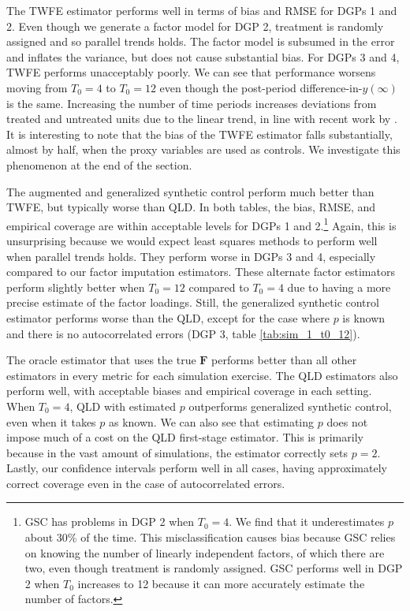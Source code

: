 \documentclass[12pt]{article}
\begin{document}
The TWFE estimator performs well in terms of bias and RMSE for DGPs 1 and 2. 
Even though we generate a factor model for DGP 2, treatment is randomly assigned and so parallel trends holds. 
The factor model is subsumed in the error and inflates the variance, but does not cause substantial bias. 
For DGPs 3 and 4, TWFE performs unacceptably poorly. 
We can see that performance worsens moving from $T_0 = 4$ to $T_0 = 12$ even though the post-period difference-in-$y(\infty)$ is the same. 
Increasing the number of time periods increases deviations from treated and untreated units due to the linear trend, in line with recent work by \citet{milliment2023misuse}.
It is interesting to note that the bias of the TWFE estimator falls substantially, almost by half, when the proxy variables are used as controls. We investigate this phenomenon at the end of the section. 

The augmented and generalized synthetic control perform much better than TWFE, but typically worse than QLD. 
In both tables, the bias, RMSE, and empirical coverage are within acceptable levels for DGPs 1 and 2.\footnote{GSC has problems in DGP 2 when $T_0 = 4$. We find that it underestimates $p$ about 30\% of the time. This misclassification causes bias because GSC relies on knowing the number of linearly independent factors, of which there are two, even though treatment is randomly assigned. GSC performs well in DGP 2 when $T_0$ increases to 12 because it can more accurately estimate the number of factors.} 
Again, this is unsurprising because we would expect least squares methods to perform well when parallel trends holds. 
They perform worse in DGPs 3 and 4, especially compared to our factor imputation estimators.
These alternate factor estimators perform slightly better when $T_0 = 12$ compared to $T_0 = 4$ due to having a more precise estimate of the factor loadings. 
Still, the generalized synthetic control estimator performs worse than the QLD, except for the case where $p$ is known and there is no autocorrelated errors (DGP 3, table \ref{tab:sim_1_t0_12}).

The oracle estimator that uses the true $\bm F$ performs better than all other estimators in every metric for each simulation exercise. 
The QLD estimators also perform well, with acceptable biases and empirical coverage in each setting. When $T_0 = 4$, QLD with estimated $p$ outperforms generalized synthetic control, even when it takes $p$ as known. We can also see that estimating $p$ does not impose much of a cost on the QLD first-stage estimator. This is primarily because in the vast amount of simulations, the estimator correctly sets $p = 2$. 
Lastly, our confidence intervals perform well in all cases, having approximately correct coverage even in the case of autocorrelated errors. 
\end{document}
